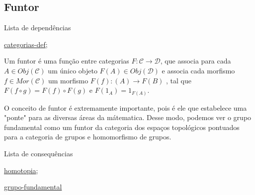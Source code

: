 \subsection{Funtor}
\label{funtor-categorias-def}
\begin{titlemize}{Lista de dependências}
	\item \hyperref[categorias-def]{categorias-def};\\ %
\end{titlemize}
\begin{defi}
	Um funtor é uma função entre categorias $F: \mathcal{C} \longrightarrow \mathcal{D}$, que associa para cada $A \in Obj(\mathcal{C})$ um único objeto $F(A) \in Obj(\mathcal{D})$ e associa cada morfismo $f \in Mor(\mathcal{C})$ um morfismo $F(f): (A) \longrightarrow F(B)$ , tal que $F(f \circ g) = F(f) \circ F(g) $ e $F(1_A) = 1_{F(A)}$.
\end{defi}

O conceito de funtor é extremamente importante, pois é ele que estabelece uma "ponte" para as diversas áreas da mátematica. Desse modo, podemos ver o grupo fundamental como um funtor da categoria dos espaços topológicos pontuados para a categoria de grupos e homomorfismo de grupos.

\begin{titlemize}{Lista de consequências}
	\item \hyperref[homotopia]{homotopia};\\ %
	\item \hyperref[grupo-fundamental]{grupo-fundamental}
\end{titlemize}

